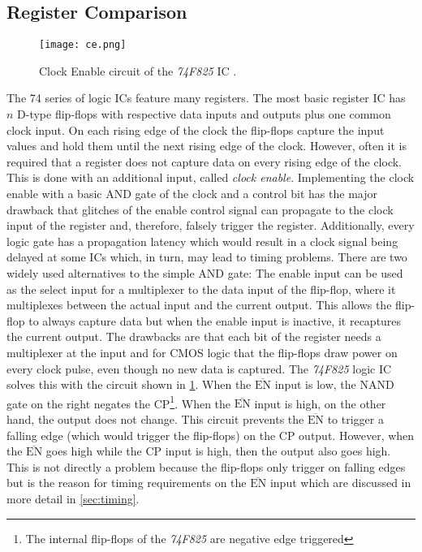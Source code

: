 \subsection{Register Comparison}
\begin{figure}[t]
  \centering
  \texttt{[image: ce.png]}
  \caption{Clock Enable circuit of the \emph{74F825} \gls{IC} \cite{74f825}.}
  \label{fig:clockEnable}
\end{figure}
The 74 series of logic \glspl{IC} feature many registers.
The most basic register \gls{IC} has $n$ D-type flip-flops with respective data inputs and outputs plus one common clock input.
On each rising edge of the clock the flip-flops capture the input values and hold them until the next rising edge of the clock.
However, often it is required that a register does not capture data on every rising edge of the clock.
This is done with an additional input, called \emph{clock enable}.
Implementing the clock enable with a basic AND gate of the clock and a control bit has the major drawback that glitches of the enable control signal can propagate to the clock input of the register and, therefore, falsely trigger the register.
Additionally, every logic gate has a propagation latency which would result in a clock signal being delayed at some \glspl{IC} which, in turn, may lead to timing problems.
There are two widely used alternatives to the simple AND gate:
The enable input can be used as the select input for a multiplexer to the data input of the flip-flop, where it multiplexes between the actual input and the current output.
This allows the flip-flop to always capture data but when the enable input is inactive, it recaptures the current output.
The drawbacks are that each bit of the register needs a multiplexer at the input and for \gls{CMOS} logic that the flip-flops draw power on every clock pulse, even though no new data is captured.
The \emph{74F825} logic \gls{IC} solves this with the circuit shown in \cref{fig:clockEnable}.
When the $\overline{\text{EN}}$ input is low, the NAND gate on the right negates the CP\footnote{The internal flip-flops of the \emph{74F825} are negative edge triggered}.
When the $\overline{\text{EN}}$ input is high, on the other hand, the output does not change.
This circuit prevents the $\overline{\text{EN}}$ to trigger a falling edge (which would trigger the flip-flops) on the CP output.
However, when the $\overline{\text{EN}}$ goes high while the CP input is high, then the output also goes high.
This is not directly a problem because the flip-flops only trigger on falling edges but is the reason for timing requirements on the $\overline{\text{EN}}$ input which are discussed in more detail in \cref{sec:timing}.
